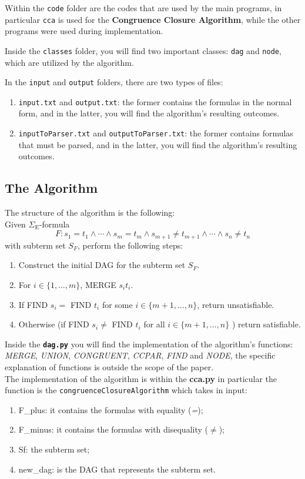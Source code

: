 \documentclass{article}
\begin{document}
Within the \texttt{code} folder are the codes that are used by the main programs, in particular \texttt{cca} is used for the \textbf{Congruence Closure Algorithm}, while the other programs were used during implementation.

Inside the \texttt{classes} folder, you will find two important classes: \texttt{dag} and \texttt{node}, which are utilized by the algorithm.

In the \texttt{input} and \texttt{output} folders, there are two types of files:
\begin{enumerate}
\item \texttt{input.txt} and \texttt{output.txt}: the former contains the formulas in the normal form, and in the latter, you will find the algorithm's resulting outcomes.
\item \texttt{inputToParser.txt} and \texttt{outputToParser.txt}: the former contains formulas that must be parsed, and in the latter, you will find the algorithm's resulting outcomes.
\end{enumerate}

\subsection{The Algorithm}
The structure of the algorithm is the following:\\
Given $\Sigma_{\mathrm{E}}$-formula
$$
F: s_1=t_1 \wedge \cdots \wedge s_m=t_m \wedge s_{m+1} \neq t_{m+1} \wedge \cdots \wedge s_n \neq t_n
$$
with subterm set $S_F$, perform the following steps:
\begin{enumerate}
    \item Construct the initial DAG for the subterm set $S_F$.
    \item For $i \in\{1, \ldots, m\}$, MERGE $s_i t_i$.
    \item If FIND $s_i=$ FIND $t_i$ for some $i \in\{m+1, \ldots, n\}$, return unsatisfiable.
    \item Otherwise (if FIND $s_i \neq$ FIND $t_i$ for all $i \in\{m+1, \ldots, n\}$ ) return satisfiable.
\end{enumerate}

Inside the \textbf{\texttt{dag.py}} you will find the implementation of the algorithm's functions: \textit{MERGE}, \textit{UNION}, \textit{CONGRUENT}, \textit{CCPAR}, \textit{FIND} and \textit{NODE}, the specific explanation of functions is outside the scope of the paper. \\

The implementation of the algorithm is within the \textbf{cca.py} in particular the function is the \texttt{congruenceClosureAlgorithm} which takes in input: 
\begin{enumerate}
    \item F\_plus: it contains the formulas with equality (\textit{=});
    \item F\_minus: it contains the formulas with disequality (\textit{$\neq$});
    \item Sf: the subterm set;
    \item new\_dag: is the DAG that represents the subterm set.
\end{enumerate}
\end{document}
